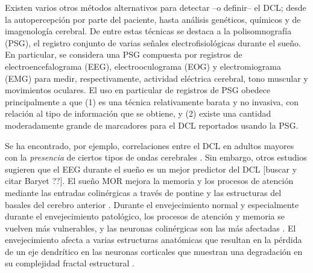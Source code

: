 
Existen varios otros métodos alternativos para detectar --o definir-- el DCL; desde la autopercepción por parte del paciente, hasta análisis genéticos, químicos y de imagenología cerebral.
%
De entre estas técnicas se destaca a la polisomnografía (PSG), el registro conjunto de varias señales electrofisiológicas durante el sueño.
%
En particular, se considera una PSG compuesta por registros de electroencefalograma (EEG), electrooculograma (EOG) y electromiograma (EMG) para medir, respectivamente, actividad eléctrica cerebral, tono muscular y movimientos oculares.
%
El uso en particular de registros de PSG obedece principalmente a que (1) es una técnica relativamente barata y no invasiva, con relación al tipo de información que se obtiene, y (2) existe una cantidad moderadamente grande de marcadores para el DCL reportados usando la PSG.

Se ha encontrado, por ejemplo, correlaciones entre el DCL en adultos mayores con la \textit{presencia} de ciertos tipos de ondas cerebrales \cite{babiloni13,prichep94,prichep06}.
%
Sin embargo, otros estudios sugieren que el EEG durante el sueño es un mejor predictor del DCL [buscar y citar Baryet ??].
%
El sueño MOR mejora la memoria y los procesos de atención mediante las entradas colinérgicas \cite{Braun} a través de pontine \cite{Datta2004} y las estructuras del basales del cerebro anterior \cite{Blake}. Durante el envejecimiento normal y especialmente durante el envejecimiento patológico, los procesos de atención y memoria se vuelven más vulnerables, y las neuronas colinérgicas son las más afectadas \cite{Schliebs11}. El envejecimiento afecta a varias estructuras anatómicas que resultan en la pérdida de un eje dendrítico en las neuronas corticales que muestran una degradación en su complejidad fractal estructural \cite{Lipsitz}.

